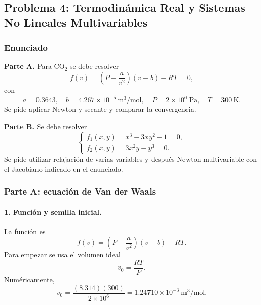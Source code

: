 \documentclass[11pt,a4paper]{article}
\begin{document}
\subsection{Problema 4: Termodinámica Real y Sistemas No Lineales Multivariables}

\subsubsection*{Enunciado}

\textbf{Parte A.} Para CO$_2$ se debe resolver
\begin{equation}
f(v)=\left(P+\frac{a}{v^2}\right)(v-b)-RT=0,
\end{equation}
con
\[
a=0.3643,\quad
b=4.267\times10^{-5}\ \mathrm{m^3/mol},
\quad
P=2\times10^6\ \mathrm{Pa},
\quad
T=300\ \mathrm K.
\]
Se pide aplicar Newton y secante y comparar la convergencia.

\textbf{Parte B.} Se debe resolver
\begin{equation}
\begin{cases}
f_1(x,y)=x^3-3xy^2-1=0,\\
f_2(x,y)=3x^2y-y^3=0.
\end{cases}
\end{equation}
Se pide utilizar relajación de varias variables y después Newton multivariable con el Jacobiano indicado en el enunciado.

\subsubsection*{Parte A: ecuación de Van der Waals}

\paragraph{1. Función y semilla inicial.}

La función es
\[
f(v)=\left(P+\frac{a}{v^2}\right)(v-b)-RT.
\]
Para empezar se usa el volumen ideal
\begin{equation}
\boxed{v_0=\frac{RT}{P}.}
\end{equation}
Numéricamente,
\[
v_0=\frac{(8.314)(300)}{2\times10^6}
=1.24710\times10^{-3}\ \mathrm{m^3/mol}.
\]
\end{document}

